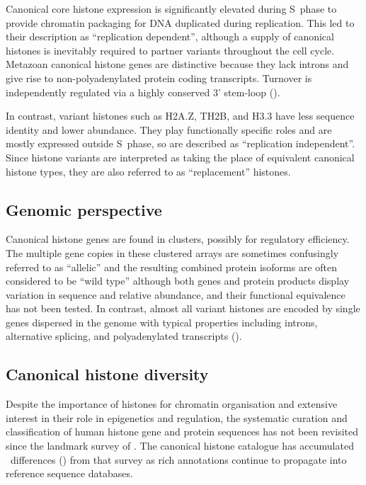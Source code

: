     Canonical core histone expression
    is significantly elevated during S~phase to provide chromatin packaging
    for DNA duplicated during replication.
    This led to their description as ``replication dependent'',
    although a supply of canonical histones is inevitably required
    to partner variants throughout the cell cycle.
    Metazoan canonical histone genes are distinctive
    because they lack introns and give rise to non-polyadenylated protein coding transcripts.
    Turnover is independently regulated via a highly
    conserved 3' stem-loop ().

    In contrast, variant histones such as H2A.Z, TH2B, and H3.3 have
    less sequence identity and lower abundance.
    They play functionally specific roles and are mostly expressed outside S~phase,
    so are described as ``replication independent''.
    Since histone variants are interpreted as taking the place
    of equivalent canonical histone types,
    they are also referred to as ``replacement'' histones.

  \subsection{Genomic perspective}

    Canonical histone genes are found in \NumberOfClusters{} clusters,
    possibly for regulatory efficiency.
    The multiple gene copies in these clustered arrays are
    sometimes confusingly referred to as ``allelic''
    and the resulting combined protein isoforms are often considered to be ``wild type''
    although both genes and protein products display
    variation in sequence and relative abundance,
    and their functional equivalence has not been tested.
    In contrast, almost all variant histones are encoded by single genes dispersed in the genome
    with typical properties including introns, alternative splicing,
    and polyadenylated transcripts ().

  \subsection{Canonical histone diversity}

    Despite the importance of histones for chromatin organisation and extensive interest
    in their role in epigenetics and regulation, the systematic
    curation and classification of human histone
    gene and protein sequences has not been revisited
    since the landmark survey of \citet{Marzluff02}.
    The canonical histone catalogue has accumulated
    \result{}~differences ()
    from that survey as rich annotations continue to propagate
    into reference sequence databases.

